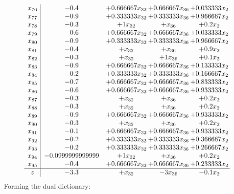 \documentclass[11pt]{article}
\begin{document}
\[\begin{array}{c| c c@{\hskip 2pt} c@{\hskip 2pt} c@{\hskip 2pt} }
 x_{76}   &  -0.4 & + 0.666667 x_{32} & + 0.666667 x_{36} & + 0.033333 x_{2}\\
 x_{77}   &  -0.9 & + 0.333333 x_{32} & + 0.333333 x_{36} & + 0.966667 x_{2}\\
 x_{78}   &  -0.3 & + 1 x_{32} & +  x_{36} & + 0.2 x_{2}\\
 x_{79}   &  -0.6 & + 0.666667 x_{32} & + 0.666667 x_{36} & + 0.033333 x_{2}\\
 x_{80}   &  -0.9 & + 0.333333 x_{32} & + 0.333333 x_{36} & + 0.966667 x_{2}\\
 x_{81}   &  -0.4 & +  x_{32} & +  x_{36} & + 0.9 x_{2}\\
 x_{82}   &  -0.3 & +  x_{32} & + 1 x_{36} & + 0.1 x_{2}\\
 x_{83}   &  -0.9 & + 0.666667 x_{32} & + 0.666667 x_{36} & + 0.133333 x_{2}\\
 x_{84}   &  -0.2 & + 0.333333 x_{32} & + 0.333333 x_{36} & + 0.166667 x_{2}\\
 x_{85}   &  -0.7 & + 0.666667 x_{32} & + 0.666667 x_{36} & + 0.833333 x_{2}\\
 x_{86}   &  -0.6 & + 0.666667 x_{32} & + 0.666667 x_{36} & + 0.933333 x_{2}\\
 x_{87}   &  -0.3 & +  x_{32} & +  x_{36} & + 0.2 x_{2}\\
 x_{88}   &  -0.3 & +  x_{32} & +  x_{36} & + 0.2 x_{2}\\
 x_{89}   &  -0.9 & + 0.666667 x_{32} & + 0.666667 x_{36} & + 0.933333 x_{2}\\
 x_{90}   &  -0.3 & +  x_{32} & +  x_{36} & + 0.2 x_{2}\\
 x_{91}   &  -0.1 & + 0.666667 x_{32} & + 0.666667 x_{36} & + 0.933333 x_{2}\\
 x_{92}   &  -0.2 & + 0.333333 x_{32} & + 0.333333 x_{36} & + 0.366667 x_{2}\\
 x_{93}   &  -0.2 & + 0.333333 x_{32} & + 0.333333 x_{36} & + 0.266667 x_{2}\\
 x_{94}   &  -0.0999999999999 & + 1 x_{32} & +  x_{36} & + 0.2 x_{2}\\
 x_{95}   &  -0.4 & + 0.666667 x_{32} & + 0.666667 x_{36} & + 0.233333 x_{2}\\
\hline
z    &  -3.3 & +  x_{32} & -3 x_{36} & -0.1 x_{2}\\
\end{array}\]
Forming the dual dictionary:
\end{document}
